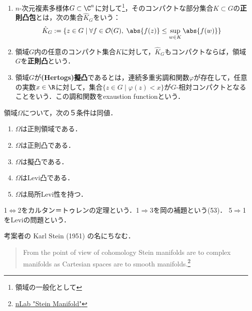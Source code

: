 \documentclass[uplatex, dvipdfmx]{jsreport}
\begin{document}
\begin{definition}
    \begin{enumerate}
        \item $n$-次元複素多様体$G\subset\C^n$に対して\footnote{領域の一般化として}，そのコンパクトな部分集合$K\subset G$の\textbf{正則凸包}とは，次の集合$\hat{K}_G$をいう：
        \[\hat{K}_G:=\{z\in G\mid \forall f\in\mathcal{O}(G),\;\abs{f(z)}\le\sup_{w\in K}\abs{f(w)}\}\]
        \item 領域$G$内の任意のコンパクト集合$K$に対して，$\hat{K}_G$もコンパクトならば，領域$G$を\textbf{正則凸}という．
        \item 領域$G$が\textbf{(Hertogs)擬凸}であるとは，連続多重劣調和関数$\varphi$が存在して，任意の実数$x\in\R$に対して，集合$\{z\in G\mid\varphi(z)<x\}$が$G$-相対コンパクトとなることをいう．この調和関数をexaustion functionという．
    \end{enumerate}
\end{definition}

\begin{theorem}
    領域$\Omega$について，次の５条件は同値．
    \begin{enumerate}
        \item $\Omega$は正則領域である．
        \item $\Omega$は正則凸である．
        \item $\Omega$は擬凸である．
        \item $\Omega$はLevi凸である．
        \item $\Omega$は局所Levi性を持つ．
    \end{enumerate}
    1$\Leftrightarrow$2をカルタン＝トゥレンの定理という．1$\Rightarrow$3を岡の補題という(53)．
    5$\Rightarrow$1をLeviの問題という．
\end{theorem}

\begin{definition}
    
\end{definition}
\begin{remark}
    考案者の Karl Stein (1951) の名にちなむ．
    \begin{quote}
        From the point of view of cohomology Stein manifolds are to complex manifolds as Cartesian spaces are to smooth manifolds.\footnote{\href{https://ncatlab.org/nlab/show/Stein+manifold}{nLab "Stein Manifold"}}
    \end{quote}
\end{remark}
\end{document}
